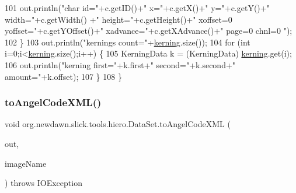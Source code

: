 \begin{DoxyCode}
101             out.println(\textcolor{stringliteral}{"char id="}+c.getID()+\textcolor{stringliteral}{"   x="}+c.getX()+\textcolor{stringliteral}{"     y="}+c.getY()+\textcolor{stringliteral}{"     width="}+c.getWidth()
      +\textcolor{stringliteral}{"     height="}+c.getHeight()+\textcolor{stringliteral}{"     xoffset=0     yoffset="}+c.getYOffset()+\textcolor{stringliteral}{"    xadvance="}+c.getXAdvance()+\textcolor{stringliteral}{"
           page=0  chnl=0 "});
102         \}
103         out.println(\textcolor{stringliteral}{"kernings count="}+\mbox{\hyperlink{classorg_1_1newdawn_1_1slick_1_1tools_1_1hiero_1_1_data_set_a6a34bd71965bd3b2e169755305389ab8}{kerning}}.size());
104         \textcolor{keywordflow}{for} (\textcolor{keywordtype}{int} i=0;i<\mbox{\hyperlink{classorg_1_1newdawn_1_1slick_1_1tools_1_1hiero_1_1_data_set_a6a34bd71965bd3b2e169755305389ab8}{kerning}}.size();i++) \{
105             KerningData k = (KerningData) \mbox{\hyperlink{classorg_1_1newdawn_1_1slick_1_1tools_1_1hiero_1_1_data_set_a6a34bd71965bd3b2e169755305389ab8}{kerning}}.get(i);
106             out.println(\textcolor{stringliteral}{"kerning first="}+k.first+\textcolor{stringliteral}{"  second="}+k.second+\textcolor{stringliteral}{"  amount="}+k.offset);
107         \}
108     \}
\end{DoxyCode}
\mbox{\label{classorg_1_1newdawn_1_1slick_1_1tools_1_1hiero_1_1_data_set_a597971c1aa14c5e6ba5e7a44bee55921}} 
\subsubsection{\texorpdfstring{to\+Angel\+Code\+X\+M\+L()}{toAngelCodeXML()}}
{\footnotesize\ttfamily void org.\+newdawn.\+slick.\+tools.\+hiero.\+Data\+Set.\+to\+Angel\+Code\+X\+ML (\begin{DoxyParamCaption}\item[{Print\+Stream}]{out,  }\item[{String}]{image\+Name }\end{DoxyParamCaption}) throws I\+O\+Exception\hspace{0.3cm}{\ttfamily [inline]}}

